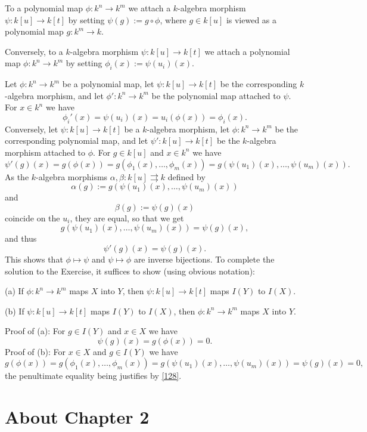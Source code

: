 \documentclass[parskip=half,fontsize=12pt]{scrartcl}%
\begin{document}
To a polynomial map $\phi:k^n\to k^m$ we attach a $k$-algebra morphism $\psi:k[u]\to k[t]$ by setting $\psi(g):=g\circ\phi$, where $g\in k[u]$ is viewed as a polynomial map $g:k^m\to k$. 

Conversely, to a $k$-algebra morphism $\psi:k[u]\to k[t]$ we attach a polynomial map $\phi:k^n\to k^m$ by setting $\phi_i(x):=\psi(u_i)(x)$. 

Let $\phi:k^n\to k^m$ be a polynomial map, let $\psi:k[u]\to k[t]$ be the corresponding $k$-algebra morphism, and let $\phi':k^n\to k^m$ be the polynomial map attached to $\psi$. For $x\in k^n$ we have 
$$
\phi_i'(x)=\psi(u_i)(x)=u_i(\phi(x))=\phi_i(x).
$$ 
Conversely, let $\psi:k[u]\to k[t]$ be a $k$-algebra morphism, let $\phi:k^n\to k^m$ be the corresponding polynomial map, and let $\psi':k[u]\to k[t]$ be the $k$-algebra morphism attached to $\phi$. For $g\in k[u]$ and $x\in k^n$ we have 
$$
\psi'(g)(x)=g(\phi(x))=g(\phi_1(x),\dots,\phi_m(x))=g(\psi(u_1)(x),\dots,\psi(u_m)(x)). 
$$ 
As the $k$-algebra morphisms $\alpha,\beta:k[u]\rightrightarrows k$ defined by 
$$
\alpha(g):=g(\psi(u_1)(x),\dots,\psi(u_m)(x))
$$ 
and 
$$
\beta(g):=\psi(g)(x)
$$ 
coincide on the $u_i$, they are equal, so that we get 
\begin{equation}\label{128}
g(\psi(u_1)(x),\dots,\psi(u_m)(x))=\psi(g)(x),
\end{equation}
and thus 
$$
\psi'(g)(x)=\psi(g)(x).
$$ 
This shows that $\phi\mapsto\psi$ and $\psi\mapsto\phi$ are inverse bijections. To complete the solution to the Exercise, it suffices to show (using obvious notation):

(a) If $\phi:k^n\to k^m$ maps $X$ into $Y$, then $\psi:k[u]\to k[t]$ maps $I(Y)$ to $I(X)$. 

(b) If $\psi:k[u]\to k[t]$ maps $I(Y)$ to $I(X)$, then $\phi:k^n\to k^m$ maps $X$ into $Y$. 

Proof of (a): For $g\in I(Y)$ and $x\in X$ we have 
$$
\psi(g)(x)=g(\phi(x))=0.
$$ 
Proof of (b): For $x\in X$ and $g\in I(Y)$ we have 
$$
g(\phi(x))=g(\phi_1(x),\dots,\phi_m(x))=g(\psi(u_1)(x),\dots,\psi(u_m)(x))=\psi(g)(x)=0,
$$ 
the penultimate equality being justifies by \eqref{128}.


\section{About Chapter 2}%
\end{document}
